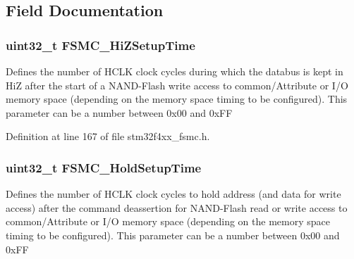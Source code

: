 \subsection{Field Documentation}
\hypertarget{struct_f_s_m_c___n_a_n_d___p_c_c_a_r_d_timing_init_type_def_ae39ab3cbe94c85c5614018cd0fc40094}{
\subsubsection[{F\-S\-M\-C\-\_\-\-Hi\-Z\-Setup\-Time}]{\setlength{\rightskip}{0pt plus 5cm}uint32\-\_\-t F\-S\-M\-C\-\_\-\-Hi\-Z\-Setup\-Time}}\label{struct_f_s_m_c___n_a_n_d___p_c_c_a_r_d_timing_init_type_def_ae39ab3cbe94c85c5614018cd0fc40094}
Defines the number of H\-C\-L\-K clock cycles during which the databus is kept in Hi\-Z after the start of a N\-A\-N\-D-\/\-Flash write access to common/\-Attribute or I/\-O memory space (depending on the memory space timing to be configured). This parameter can be a number between 0x00 and 0x\-F\-F 

Definition at line 167 of file stm32f4xx\-\_\-fsmc.\-h.

\hypertarget{struct_f_s_m_c___n_a_n_d___p_c_c_a_r_d_timing_init_type_def_a9830626a2ab6b45fa384adbc5c55eb69}{
\subsubsection[{F\-S\-M\-C\-\_\-\-Hold\-Setup\-Time}]{\setlength{\rightskip}{0pt plus 5cm}uint32\-\_\-t F\-S\-M\-C\-\_\-\-Hold\-Setup\-Time}}\label{struct_f_s_m_c___n_a_n_d___p_c_c_a_r_d_timing_init_type_def_a9830626a2ab6b45fa384adbc5c55eb69}
Defines the number of H\-C\-L\-K clock cycles to hold address (and data for write access) after the command deassertion for N\-A\-N\-D-\/\-Flash read or write access to common/\-Attribute or I/\-O memory space (depending on the memory space timing to be configured). This parameter can be a number between 0x00 and 0x\-F\-F 

